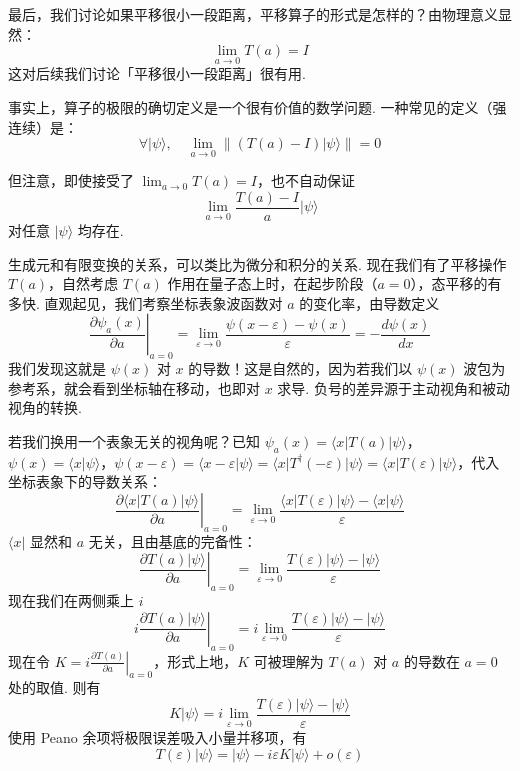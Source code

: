 最后，我们讨论如果平移很小一段距离，平移算子的形式是怎样的？由物理意义显然：
\[
\lim_{a\to0}T(a)=I
\]
这对后续我们讨论「平移很小一段距离」很有用.

事实上，算子的极限的确切定义是一个很有价值的数学问题. 一种常见的定义（强连续）是：
\[
\forall|\psi\rangle,\quad\lim_{a\to0}\left\|(T(a)-I)|\psi\rangle\right\|=0
\]

但注意，即使接受了 \(\lim_{a\to0}T(a)=I\)，也不自动保证
\[
\lim_{a\to0}\frac{T(a)-I}{a}|\psi\rangle
\]
对任意 \(|\psi\rangle\) 均存在.


生成元和有限变换的关系，可以类比为微分和积分的关系. 现在我们有了平移操作 \(T(a)\)，自然考虑 \(T(a)\) 作用在量子态上时，在起步阶段（\(a=0\)），态平移的有多快. 直观起见，我们考察坐标表象波函数对 \(a\) 的变化率，由导数定义
\[
\left.\frac{\partial\psi_a(x)}{\partial a}\right|_{a=0}
=\lim_{\varepsilon\to0}\frac{\psi(x-\varepsilon)-\psi(x)}{\varepsilon}
=-\frac{d\psi(x)}{dx}
\]
我们发现这就是 \(\psi(x)\) 对 \(x\) 的导数！这是自然的，因为若我们以 \(\psi(x)\) 波包为参考系，就会看到坐标轴在移动，也即对 \(x\) 求导. 负号的差异源于主动视角和被动视角的转换.

若我们换用一个表象无关的视角呢？已知 \(\psi_a(x)=\langle x|T(a)|\psi\rangle\)，\(\psi(x)=\langle x|\psi\rangle\)，\(\psi(x-\varepsilon)=\langle x-\varepsilon|\psi\rangle=\langle x|T^\dagger(-\varepsilon)|\psi\rangle=\langle x|T(\varepsilon)|\psi\rangle\)，代入坐标表象下的导数关系：
\[
\left.\frac{\partial\langle x|T(a)|\psi\rangle}{\partial a}\right|_{a=0}
=\lim_{\varepsilon\to0}\frac{\langle x|T(\varepsilon)|\psi\rangle-\langle x|\psi\rangle}{\varepsilon}
\]
\(\langle x|\) 显然和 \(a\) 无关，且由基底的完备性：
\[
\left.\frac{\partial T(a)|\psi\rangle}{\partial a}\right|_{a=0}
=\lim_{\varepsilon\to0}\frac{T(\varepsilon)|\psi\rangle-|\psi\rangle}{\varepsilon}
\]
现在我们在两侧乘上 \(i\) 
\[
i\left.\frac{\partial T(a)|\psi\rangle}{\partial a}\right|_{a=0}
=i\lim_{\varepsilon\to0}\frac{T(\varepsilon)|\psi\rangle-|\psi\rangle}{\varepsilon}
\]
现在令 \(K=i\left.\frac{\partial T(a)}{\partial a}\right|_{a=0}\)，形式上地，\(K\) 可被理解为 \(T(a)\) 对 \(a\) 的导数在 \(a=0\) 处的取值. 则有
\[
K|\psi\rangle=i\lim_{\varepsilon\to0}\frac{T(\varepsilon)|\psi\rangle-|\psi\rangle}{\varepsilon}
\]
使用 Peano 余项将极限误差吸入小量并移项，有
\[
T(\varepsilon)|\psi\rangle=|\psi\rangle-i\varepsilon K|\psi\rangle+o(\varepsilon)
\]

